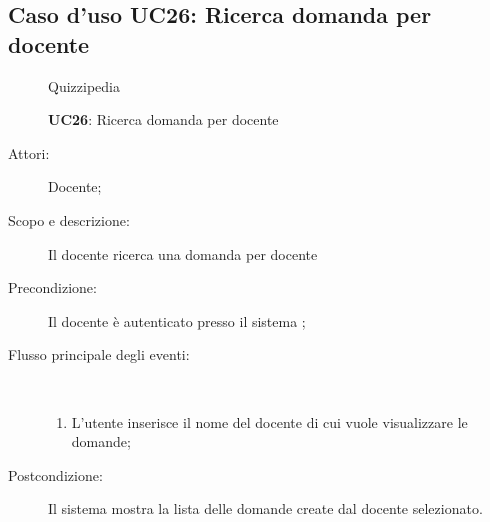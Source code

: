 \subsection{Caso d'uso UC26: Ricerca domanda per docente}
	\begin{figure}[H]
		\centering
		\begin{resizedtikzpicture}{\textwidth}
		\begin{umlsystem}[x=0, fill=lightgray!20]{Quizzipedia}
		\end{umlsystem}
		\end{resizedtikzpicture}
		\caption{\textbf{UC26}: Ricerca domanda per docente}
		\label{UC26}
	\end{figure}
\begin{description}
\item[Attori:] Docente;
\item[Scopo e descrizione:] Il docente ricerca una domanda per docente
      \item[Precondizione:] Il docente è autenticato presso il sistema
;

        \item[Flusso principale degli eventi:] \ 
 \begin{enumerate}
          \item L'utente inserisce il nome del docente di cui vuole visualizzare le domande;

      \end{enumerate}
    \item[Postcondizione:] Il sistema mostra la lista delle domande create dal docente selezionato.
  \end{description}
\hypertarget{UC27}{}
